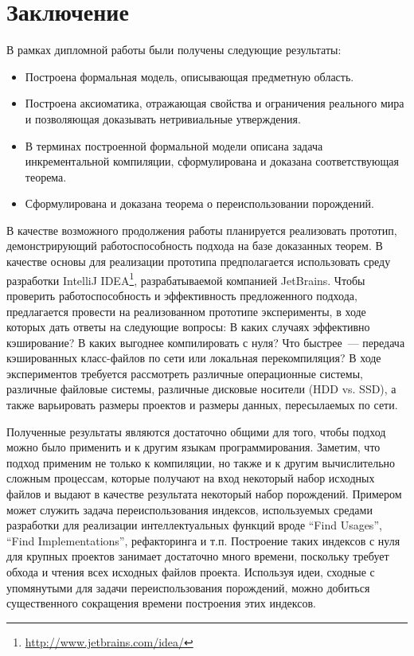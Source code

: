 \section{Заключение}

В рамках дипломной работы были получены следующие результаты:

\begin{itemize}

	\item Построена формальная модель, описывающая предметную область.

	\item Построена аксиоматика, отражающая свойства и ограничения реального мира и позволяющая доказывать нетривиальные утверждения.

	\item В терминах построенной формальной модели описана задача инкрементальной компиляции, сформулирована и доказана соответствующая теорема.

	\item Сформулирована и доказана теорема о переиспользовании порождений.

\end{itemize}

В качестве возможного продолжения работы планируется реализовать прототип, демонстрирующий работоспособность подхода на базе доказанных теорем. В качестве основы для реализации прототипа предполагается использовать среду разработки IntelliJ IDEA\footnote{\url{http://www.jetbrains.com/idea/}}, разрабатываемой компанией JetBrains. Чтобы проверить работоспособность и эффективность предложенного подхода, предлагается провести на реализованном прототипе эксперименты, в ходе которых дать ответы на следующие вопросы: В каких случаях эффективно кэширование? В каких выгоднее компилировать с нуля? Что быстрее~--- передача кэшированных класс-файлов по сети или локальная перекомпиляция? В ходе экспериментов требуется рассмотреть различные операционные системы, различные файловые системы, различные дисковые носители (HDD vs. SSD), а также варьировать размеры проектов и размеры данных, пересылаемых по сети.

Полученные результаты являются достаточно общими для того, чтобы подход можно было применить и к другим языкам программирования. Заметим, что подход применим не только к компиляции, но также и к другим вычислительно сложным процессам, которые получают на вход некоторый набор исходных файлов и выдают в качестве результата некоторый набор порождений. Примером может служить задача переиспользования индексов, используемых средами разработки для реализации интеллектуальных функций вроде ``Find Usages'', ``Find Implementations'', рефакторинга и т.п. Построение таких индексов с нуля для крупных проектов занимает достаточно много времени, поскольку требует обхода и чтения всех исходных файлов проекта. Используя идеи, сходные с упомянутыми для задачи переиспользования порождений, можно добиться существенного сокращения времени построения этих индексов.